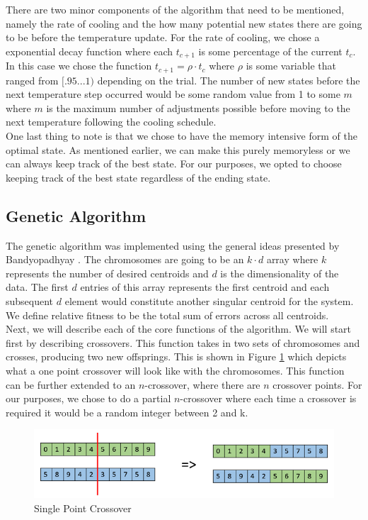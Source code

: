 \documentclass[a4paper,12pt]{article}
\numberwithin{equation}{section}
\begin{document}
There are two minor components of the algorithm that need to be mentioned, namely the rate of cooling and the how many potential new states there are going to be before the temperature update.  For the rate of cooling, we chose a exponential decay function where each $t_{c+1}$ is some percentage of the current $t_c$. In this case we chose the function $t_{c+1}=\rho\cdot t_c$ where $\rho$ is some variable that ranged from $[.95 ... 1)$ depending on the trial. The number of new states before the next temperature step occurred  would be some random value from 1 to some $m$ where $m$ is the maximum number of adjustments possible before moving to the next temperature following the cooling schedule. \\

One last thing to note is that we chose to have the memory intensive form of the optimal state. As mentioned earlier, we can make this purely memoryless or we can always keep track of the best state. For our purposes, we opted to choose keeping track of the best state regardless of the ending state.

\subsection{Genetic Algorithm}\label{sec:ga_imp}
The genetic algorithm was implemented using the general ideas presented by Bandyopadhyay  \cite{bandyopadhyay_maulik_2002}. The chromosomes are going to be an $k \cdot d$ array where $k$ represents the number of desired centroids and $d$ is the dimensionality of the data.  The first $d$ entries of this array represents the first centroid and each subsequent $d$ element would constitute another singular centroid for the system. We define relative fitness to be the total sum of errors across all centroids. \\

Next, we will describe each of the core functions of the algorithm. We will start first by describing crossovers. This function takes in two sets of chromosomes and crosses, producing two new offsprings. This is shown in Figure \ref{fig:crossover} which depicts what a one point crossover will look like with  the chromosomes.  This function can be further extended to an $n$-crossover, where there are $n$ crossover points. For our purposes, we chose to do a partial $n$-crossover where each time a crossover is required it would be a random integer between 2 and k.   
\begin{figure}[H]
    \centering
    \includegraphics[scale = 0.85]{images/one_point_crossover.jpg}
    \caption{Single Point Crossover}
    \label{fig:crossover}
\end{figure}
\end{document}
